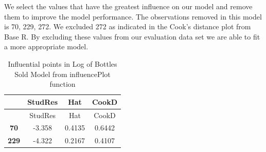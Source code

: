 \documentclass[]{elsarticle} %
\begin{document}
We select the values that have the greatest influence on our model and
remove them to improve the model performance. The observations removed
in this model is 70, 229, 272. We excluded 272 as indicated in the
Cook's distance plot from Base R. By excluding these values from our
evaluation data set we are able to fit a more appropriate model.

\begin{longtable}[]{@{}cccc@{}}
\caption{Influential points in Log of Bottles Sold Model from
influencePlot function}\tabularnewline
\toprule
\begin{minipage}[b]{0.12\columnwidth}\centering\strut
~\strut
\end{minipage} & \begin{minipage}[b]{0.12\columnwidth}\centering\strut
StudRes\strut
\end{minipage} & \begin{minipage}[b]{0.09\columnwidth}\centering\strut
Hat\strut
\end{minipage} & \begin{minipage}[b]{0.09\columnwidth}\centering\strut
CookD\strut
\end{minipage}\tabularnewline
\midrule
\endfirsthead
\toprule
\begin{minipage}[b]{0.12\columnwidth}\centering\strut
~\strut
\end{minipage} & \begin{minipage}[b]{0.12\columnwidth}\centering\strut
StudRes\strut
\end{minipage} & \begin{minipage}[b]{0.09\columnwidth}\centering\strut
Hat\strut
\end{minipage} & \begin{minipage}[b]{0.09\columnwidth}\centering\strut
CookD\strut
\end{minipage}\tabularnewline
\midrule
\endhead
\begin{minipage}[t]{0.12\columnwidth}\centering\strut
\textbf{70}\strut
\end{minipage} & \begin{minipage}[t]{0.12\columnwidth}\centering\strut
-3.358\strut
\end{minipage} & \begin{minipage}[t]{0.09\columnwidth}\centering\strut
0.4135\strut
\end{minipage} & \begin{minipage}[t]{0.09\columnwidth}\centering\strut
0.6442\strut
\end{minipage}\tabularnewline
\begin{minipage}[t]{0.12\columnwidth}\centering\strut
\textbf{229}\strut
\end{minipage} & \begin{minipage}[t]{0.12\columnwidth}\centering\strut
-4.322\strut
\end{minipage} & \begin{minipage}[t]{0.09\columnwidth}\centering\strut
0.2167\strut
\end{minipage} & \begin{minipage}[t]{0.09\columnwidth}\centering\strut
0.4107\strut
\end{minipage}\tabularnewline
\bottomrule
\end{longtable}
\end{document}
